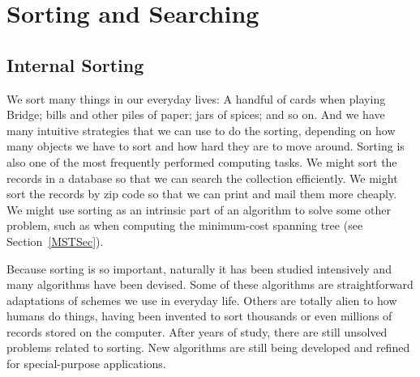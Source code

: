 
\part{Sorting and Searching}
\label{SortSearch}
\mycleardoublepage

\chapter{Internal Sorting}
\label{InSort}
\def\CHHEAD{Chap.\ \thechapter\ Internal Sorting}    %

We sort many things in our everyday lives:
A handful of cards when playing Bridge;
bills and other piles of paper; jars of spices; and so on.
And we have many intuitive strategies that we can use to do the
sorting, depending on how many objects we have to sort and how hard
they are to move around.
Sorting is also one of the most frequently performed computing tasks.
We might sort the records in a database so that we can search the
collection efficiently.
We might sort the records by zip code so that we can print and mail
them more cheaply.
We might use sorting as an intrinsic part of an algorithm to solve
some other problem, such as when computing the minimum-cost spanning
tree (see Section~\ref{MSTSec}).

Because sorting is so important, naturally it has been studied
intensively and many algorithms have been devised.
Some of these algorithms are straightforward adaptations of schemes we
use in everyday life.
Others are totally alien to how humans do things, having been invented
to sort thousands or even millions of records stored on the computer.
After years of study, there are still unsolved problems related to
sorting.
New algorithms are still being developed and refined for
special-purpose applications.

